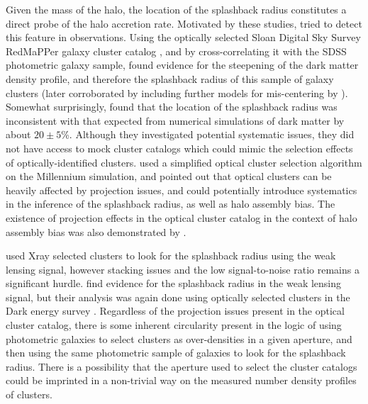 \documentclass[iop, apjl, twocolappendix, numberedappendix]{emulateapj}
\begin{document}
Given the mass of the halo, the location of the splashback radius
constitutes a direct probe of the halo accretion rate. Motivated by
these studies, \citet{more2016detection} tried to detect this
feature in observations. Using the optically selected Sloan Digital
Sky Survey RedMaPPer galaxy cluster catalog
\citep{rykoff2014redmapper}, and by cross-correlating it with the
SDSS photometric galaxy sample, \citet{more2016detection} found evidence
for the steepening of the dark matter density profile, and therefore
the splashback radius of this sample of galaxy clusters (later
corroborated by including further models for mis-centering by
\citet{baxter2017halo}). Somewhat surprisingly,
\citet{more2016detection} found that the location of the splashback
radius was inconsistent with that expected from numerical
simulations of dark matter by about $20\pm5$\%. Although they
investigated potential systematic issues, they did not have access
to mock cluster catalogs which could mimic the selection effects of
optically-identified clusters. \citet{busch2017assembly} used a
simplified optical cluster selection algorithm on the Millennium
simulation, and pointed out that optical clusters can be heavily
affected by projection issues, and could potentially introduce
systematics in the inference of the splashback radius, as well as
halo assembly bias. The existence of projection effects in the
optical cluster catalog in the context of halo assembly bias was 
also demonstrated by \citet{zu2016level}.

\citet{umetsu2017lensing} used Xray selected clusters to look for
the splashback radius using the weak lensing signal, however
stacking issues and the low signal-to-noise ratio remains a significant
hurdle. \citet{chang2017splashback} find evidence for the splashback
radius in the weak lensing signal, but their analysis was again done
using optically selected clusters in the Dark energy survey
\citep{dark2005dark}. Regardless of the projection issues present in
the optical cluster catalog, there is some inherent circularity
present in the logic of using photometric galaxies to select
clusters as over-densities in a given aperture, and then using the
same photometric sample of galaxies to look for the splashback
radius. There is a possibility that the aperture used to select the
cluster catalogs could be imprinted in a non-trivial way on the
measured number density profiles of clusters. 
\end{document}
